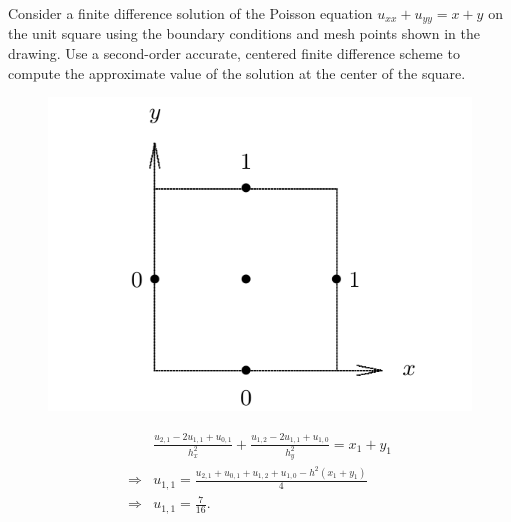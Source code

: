 \begin{pro}
  Consider a finite difference solution of the Poisson equation
  $u_{xx}+u_{yy}=x+y$ on the unit square using the boundary
  conditions and mesh points shown in the drawing.
  Use a second-order accurate,
  centered finite difference scheme to compute the approximate
  value of the solution at the center of the square.
  \begin{figure}[H]
    \centering
    \includegraphics[scale=0.25]{poisson.png}
  \end{figure}
\end{pro}

\begin{sol}
  \begin{align*}
    & \frac{u_{2,1}-2u_{1,1}+u_{0,1}}{h_x^2} +
      \frac{u_{1,2}-2u_{1,1}+u_{1,0}}{h_y^2} = x_1 + y_1 \\
    \Rightarrow & u_{1,1} = \frac{u_{2,1}+u_{0,1}+u_{1,2}+u_{1,0}-h^2(x_1+y_1)}{4} \\
    \Rightarrow & u_{1,1} = \frac{7}{16}.
  \end{align*}
\end{sol}
